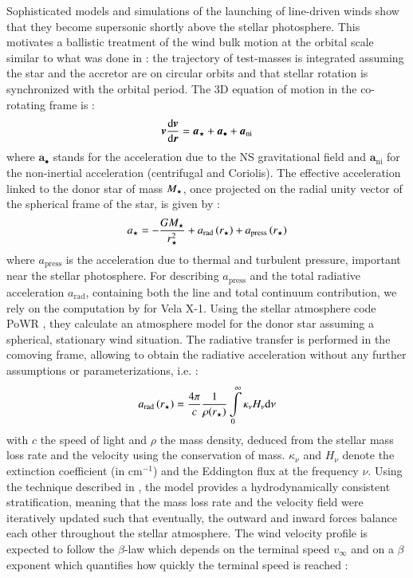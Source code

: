 \documentclass{aa}
\makeatletter
\newcommand*{\ns}{NS\@\xspace}
\newcommand*\diff{\mathop{}\!\mathrm{d}}
\newcommand{\mystar}{{\fontfamily{lmr}\selectfont$\star$}}
\makeatother
\begin{document}
Sophisticated models and simulations of the launching of line-driven winds show that they become supersonic shortly above the stellar photosphere. This motivates a ballistic treatment of the wind bulk motion at the orbital scale similar to what was done in \cite{ElMellah2016a} : the trajectory of test-masses is integrated assuming the star and the accretor are on circular orbits and that stellar rotation is synchronized with the orbital period. The 3D equation of motion in the co-rotating frame is :
\begin{equation}
\label{eq:ball}
\boldsymbol{v}\frac{\diff \boldsymbol{v}}{\diff \boldsymbol{r}} = \boldsymbol{a}_{\text{\mystar}} + \boldsymbol{a}_{\bullet} + \boldsymbol{a}_{\text{ni}}
\end{equation}
where $\boldsymbol{a}_{\bullet}$ stands for the acceleration due to the \ns gravitational field and $\boldsymbol{a}_{\text{ni}}$ for the non-inertial acceleration (centrifugal and Coriolis). The effective acceleration linked to the donor star of mass $M_{\text{\mystar}}$, once projected on the radial unity vector of the spherical frame of the star, is given by :
\begin{equation}
a_{\text{\mystar}}=-\frac{GM_{\text{\mystar}}}{r_{\text{\mystar}}^2}+a_{\text{rad}}\left(r_{\text{\mystar}}\right)+a_{\text{press}}\left(r_{\text{\mystar}}\right)
\end{equation}
where $a_{\text{press}}$ is the acceleration due to thermal and turbulent pressure, important near the stellar photosphere. For describing $a_{\text{press}}$ and the total radiative acceleration $a_{\text{rad}}$, containing both the line and total continuum contribution, we rely on the computation by \cite{Sander2017} for Vela X-1. Using the stellar atmosphere code PoWR \citep[e.g.]{Hamann1998,Grafener2002}, they calculate an atmosphere model for the donor star assuming a spherical, stationary wind situation. The radiative transfer is performed in the comoving frame, allowing to obtain the radiative acceleration without any further assumptions or parameterizations, i.e. :
\begin{equation}
\label{eq:araddef}
a_{\text{rad}}\left(r_{\text{\mystar}}\right)  = \frac{4\pi}{c} \frac{1}{\rho(r_{\text{\mystar}})}  \int\limits_{0}^{\infty} \kappa_\nu H_\nu \mathrm{d}\nu 
\end{equation}
with $c$ the speed of light and $\rho$ the mass density, deduced from the stellar mass loss rate and the velocity using the conservation of mass. $\kappa_{\nu}$ and $H_{\nu}$ denote the extinction coefficient (in cm$^{-1}$) and the Eddington flux at the frequency $\nu$. Using the technique described in \cite{Sander2017b}, the model provides a hydrodynamically consistent stratification, meaning that the mass loss rate and the velocity field were iteratively updated such that eventually, the outward and inward forces balance each other throughout the stellar atmosphere. The wind velocity profile is expected to follow the $\beta$-law which depends on the terminal speed $v_{\infty}$ and on a $\beta$ exponent which quantifies how quickly the terminal speed is reached :
\end{document}
